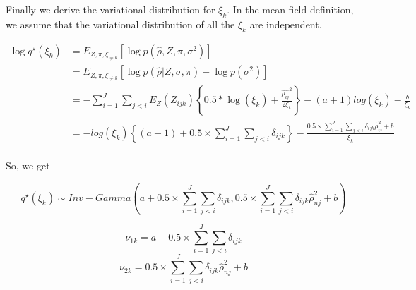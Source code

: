\documentclass[12pt]{article}
\begin{document}
Finally we derive the variational distribution for $\xi_{k}$. In the mean field definition, we assume that the variational distribution of all the $\xi_{k}$ are independent.

\begin{align}
\log q^{\star} \left ( \xi_{k} \right ) & = E_{Z, \pi, \xi_{\neq k} } \left [  \log p ( \hat{\rho}, Z, \pi, \sigma^2 ) \right ]   \\
				& = E_{Z, \pi, \xi_{\neq k} } \left [  \log p (\hat{\rho} | Z, \sigma, \pi) + \log p(\sigma^2 )  \right ] \\
				& =  - \sum_{i=1}^{J} \sum_{j < i}  E_{Z} (Z_{ijk}) \left \{ 0.5* \log (\xi_{k}) + \frac{\hat{\rho_{ij}}^2}{2 \xi_{k}} \right \}  - (a+1) log (\xi_{k}) - \frac{b}{\xi_{k}} \\
				& =  -  log (\xi_{k}) \left \{  (a+1) +  0.5 \times \sum_{i=1}^{J} \sum_{j < i}  \delta_{ijk} \right \}  -   \frac{  0.5 \times \sum_{i=1}^{J} \sum_{j < i} \delta_{ijk} \hat{\rho}^2_{ij} + b}{ \xi_{k}} \\
\end{align}
				
So, we get 

$$ q^{\star}(\xi_{k})  \sim Inv-Gamma \left (  a +  0.5 \times \sum_{i=1}^{J} \sum_{j < i}  \delta_{ijk}, 0.5 \times \sum_{i=1}^{J} \sum_{j < i}  \delta_{ijk} \hat{\rho}^2_{nj} + b \right ) $$

$$ \nu_{1k} = a +  0.5 \times \sum_{i=1}^{J} \sum_{j < i}  \delta_{ijk} $$
$$ \nu_{2k} = 0.5 \times \sum_{i=1}^{J} \sum_{j < i}  \delta_{ijk} \hat{\rho}^2_{nj} + b $$
\end{document}

